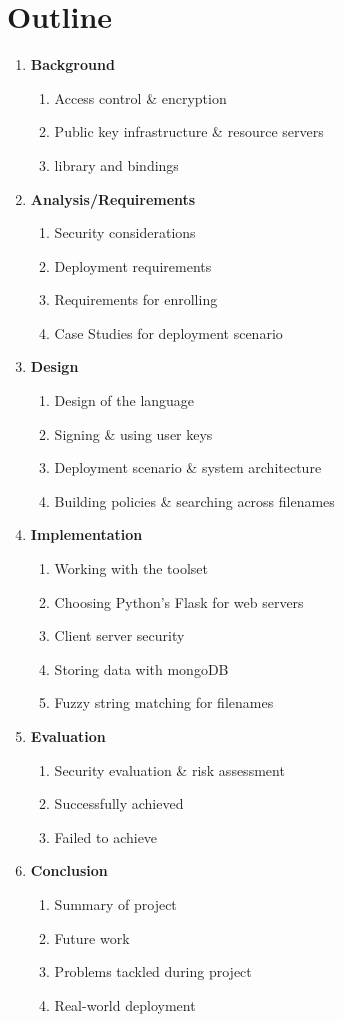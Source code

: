 \section{Outline}
\label{sec:intro_outline}

\begin{enumerate}
  \item \textbf{Background}
  \begin{enumerate}
    \item Access control \& encryption
		\item Public key infrastructure \& resource servers
		\item \OpenABE library and \PyOpenABE bindings
  \end{enumerate}
  \item \textbf{Analysis/Requirements}
  \begin{enumerate}
    \item Security considerations
    \item Deployment requirements
    \item Requirements for enrolling
		\item Case Studies for deployment scenario
  \end{enumerate}
	\item \textbf{Design}
  \begin{enumerate}
    \item Design of the \thePolicyLang language
    \item Signing \& using user keys
    \item Deployment scenario \& system architecture
		\item Building policies \& searching across filenames
  \end{enumerate}
	\item \textbf{Implementation}
  \begin{enumerate}
    \item Working with the \OpenABE toolset
    \item Choosing Python's Flask for web servers
    \item Client server security
		\item Storing data with mongoDB
		\item Fuzzy string matching for filenames
  \end{enumerate}
	\item \textbf{Evaluation}
  \begin{enumerate}
    \item Security evaluation \& risk assessment
    \item Successfully achieved
    \item Failed to achieve
  \end{enumerate}
	\item \textbf{Conclusion}
  \begin{enumerate}
    \item Summary of project
    \item Future work
    \item Problems tackled during project
		\item Real-world deployment
  \end{enumerate}
\end{enumerate}

